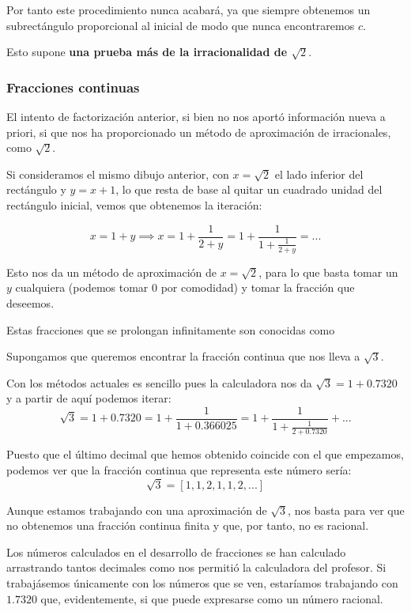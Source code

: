 \documentclass{apuntes}
\begin{document}
Por tanto este procedimiento nunca acabará, ya que siempre obtenemos un subrectángulo proporcional al inicial de modo que nunca encontraremos $c$.

Esto supone \textbf{una prueba más de la irracionalidad de $\sqrt{2}$}.

\subsubsection{Fracciones continuas}
El intento de factorización anterior, si bien no nos aportó información nueva a priori, si que nos ha proporcionado un método de aproximación de irracionales, como $\sqrt{2}$.

Si consideramos el mismo dibujo anterior, con $x = \sqrt{2}$ el lado inferior del rectángulo y $y=x+1$, lo que resta de base al quitar un cuadrado unidad del rectángulo inicial, vemos que obtenemos la iteración:

\[x = 1+y \implies x = 1 + \frac{1}{2+y} = 1 + \frac{1}{1 + \frac{1}{2+y}} = ... \]

Esto nos da un método de aproximación de $x=\sqrt{2}$, para lo que basta tomar un $y$ cualquiera (podemos tomar 0 por comodidad) y tomar la fracción que deseemos.

Estas fracciones que se prolongan infinitamente son conocidas como 

\begin{example}
Supongamos que queremos encontrar la fracción continua que nos lleva a $\sqrt{3}$.

Con los métodos actuales es sencillo pues la calculadora nos da $\sqrt{3} = 1 +0.7320$ y a partir de aquí podemos iterar:
\[\sqrt{3}=1+0.7320 = 1 +\frac{1}{1 + 0.366025} = 1 + \frac{1}{1+ \frac{1}{2+0.7320}}+ ...\]

Puesto que el último decimal que hemos obtenido coincide con el que empezamos, podemos ver que la fracción continua que representa este número sería:
\[\sqrt{3} = [1,1,2,1,1,2,...]\]

Aunque estamos trabajando con una aproximación de $\sqrt{3}$, nos basta para ver que no obtenemos una fracción continua finita y que, por tanto, no es racional.

\obs Los números calculados en el desarrollo de fracciones se han calculado arrastrando tantos decimales como nos permitió la calculadora del profesor. Si trabajásemos únicamente con los números que se ven, estaríamos trabajando con $1.7320$ que, evidentemente, si que puede expresarse como un número racional.
\end{example}
\end{document}

